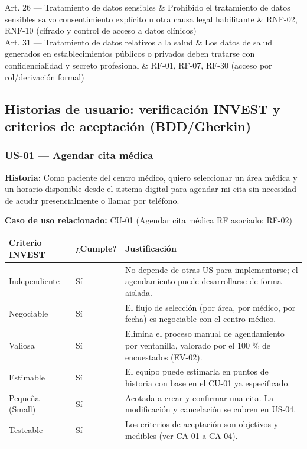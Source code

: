 \documentclass[11pt,a4paper]{article}
\begin{document}
\begin{longtable}[]
		Art. 26 --- Tratamiento de datos sensibles & Prohibido el tratamiento de datos sensibles salvo consentimiento explícito u otra causa legal habilitante & RNF-02, RNF-10 (cifrado y control de acceso a datos clínicos) \\
		Art. 31 --- Tratamiento de datos relativos a la salud & Los datos de salud generados en establecimientos públicos o privados deben tratarse con confidencialidad y secreto profesional & RF-01, RF-07, RF-30 (acceso por rol/derivación formal) \\
	\end{longtable}
	
	
	\subsection{ Historias de usuario: verificación INVEST y criterios de aceptación (BDD/Gherkin)}
	
	\subsubsection{US-01 --- Agendar cita médica}
	
	\textbf{Historia:} Como paciente del centro médico, quiero seleccionar un área médica y un horario disponible desde el sistema digital para agendar mi cita sin necesidad de acudir presencialmente o llamar por teléfono.
	
	\textbf{Caso de uso relacionado:} CU-01 (Agendar cita médica \textbar{} RF asociado: RF-02)
	
	\begin{longtable}{p{} p{} p{}}
		
		
		\toprule
		\textbf{Criterio INVEST} &
		\textbf{¿Cumple?} &
		\textbf{Justificación} \\
		\midrule
		\endhead
		
		Independiente & Sí & No depende de otras US para implementarse; el agendamiento puede desarrollarse de forma aislada. \\
		Negociable & Sí & El flujo de selección (por área, por médico, por fecha) es negociable con el centro médico. \\
		Valiosa & Sí & Elimina el proceso manual de agendamiento por ventanilla, valorado por el 100 \% de encuestados (EV-02). \\
		Estimable & Sí & El equipo puede estimarla en puntos de historia con base en el CU-01 ya especificado. \\
		Pequeña (Small) & Sí & Acotada a crear y confirmar una cita. La modificación y cancelación se cubren en US-04. \\
		Testeable & Sí & Los criterios de aceptación son objetivos y medibles (ver CA-01 a CA-04). \\
		
		\bottomrule
	\end{longtable}
	
\end{document}

